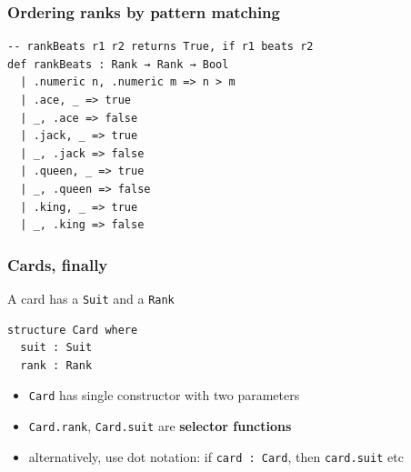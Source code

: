 \documentclass{beamer}
\begin{document}
\begin{frame}[fragile]
  \frametitle{Ordering ranks by pattern matching}
\begin{lstlisting}
-- rankBeats r1 r2 returns True, if r1 beats r2
def rankBeats : Rank → Rank → Bool
  | .numeric n, .numeric m => n > m
  | .ace, _ => true
  | _, .ace => false
  | .jack, _ => true
  | _, .jack => false
  | .queen, _ => true
  | _, .queen => false
  | .king, _ => true
  | _, .king => false
\end{lstlisting}
\end{frame}



\begin{frame}[fragile]
  \frametitle{Cards, finally}
  A card has a \lstinline{Suit} and a \lstinline{Rank}
\begin{lstlisting}
structure Card where
  suit : Suit
  rank : Rank
\end{lstlisting}
  \begin{itemize}
  \item \lstinline{Card} has single constructor with two parameters
  \item \lstinline{Card.rank}, \lstinline{Card.suit} are \textbf{selector
      functions} 
  \item alternatively, use dot notation: if \lstinline{card : Card}, then
    \lstinline{card.suit} etc
  \end{itemize}
\end{frame}
\end{document}

